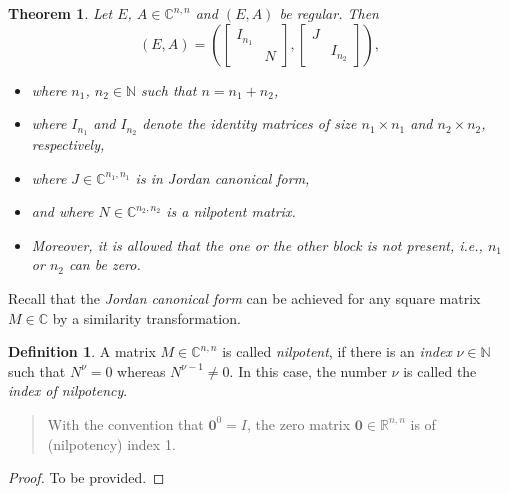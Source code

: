 \documentclass[]{book}
\providecommand{\tightlist}{%
  \setlength{\itemsep}{0pt}\setlength{\parskip}{0pt}}
\newenvironment {JHSAYS} [0] {\begin{quote}\color{jhsc}} {\end{quote}}
\newtheorem{theorem}{Theorem}[chapter]
\theoremstyle{definition}
\newtheorem{definition}{Definition}[chapter]
\theoremstyle{definition}
\theoremstyle{definition}
\theoremstyle{remark}
\begin{document}
\begin{theorem}
\protect\hypertarget{thm:weierstrass-cf}{}{\label{thm:weierstrass-cf} }Let \(E\), \(A \in \mathbb C^{n,n}\) and \((E,A)\) be regular. Then
\begin{equation}
(E, A) = 
\left (
\begin{bmatrix}
I_{n_1} \\
& N
\end{bmatrix}
,
\begin{bmatrix}
J \\
& I_{n_2}
\end{bmatrix}
\right ),
\label{eq:weierstrass-cf}
\end{equation}

\begin{itemize}
\tightlist
\item
  where \(n_1\), \(n_2 \in \mathbb N\) such that \(n=n_1+n_2\),
\item
  where \(I_{n_1}\) and \(I_{n_2}\) denote the identity matrices of size \(n_1\times n_1\) and \(n_2\times n_2\), respectively,
\item
  where \(J\in \mathbb C^{n_1,n_1}\) is in \emph{Jordan canonical form},
\item
  and where \(N \in \mathbb C^{n_2,n_2}\) is a \emph{nilpotent} matrix.
\item
  Moreover, it is allowed that the one or the other block is not present, i.e., \(n_1\) or \(n_2\) can be zero.
\end{itemize}
\end{theorem}

Recall that the \emph{Jordan canonical form} can be achieved for any square matrix \(M\in \mathbb C\) by a similarity transformation.

\begin{definition}
\protect\hypertarget{def:unnamed-chunk-11}{}{\label{def:unnamed-chunk-11} }A matrix \(M\in \mathbb C^{n,n}\) is called \emph{nilpotent}, if there is an \emph{index} \(\nu \in \mathbb N\) such that \(N^\nu=0\) whereas \(N^{\nu-1} \neq 0\). In this case, the number \(\nu\) is called the \emph{index of nilpotency}.
\end{definition}

\begin{JHSAYS}
With the convention that \(\mathbf 0^0=I\), the zero matrix
\(\mathbf 0 \in \mathbb R^{n,n}\) is of (nilpotency) index 1.
\end{JHSAYS}

\begin{proof}
{}To be provided.
\end{proof}
\end{document}
